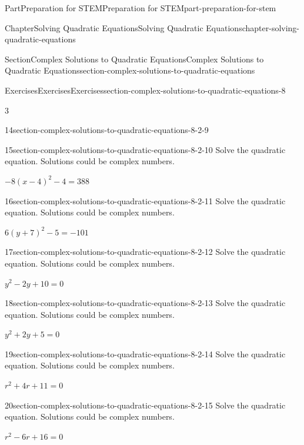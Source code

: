 \documentclass[twoside,10pt,]{book}
\numberwithin{equation}{section}
\begin{document}
\begin{partptx}{Part}{Preparation for STEM}{}{Preparation for STEM}{}{}{part-preparation-for-stem}
\begin{chapterptx}{Chapter}{Solving Quadratic Equations}{}{Solving Quadratic Equations}{}{}{chapter-solving-quadratic-equations}
\begin{sectionptx}{Section}{Complex Solutions to Quadratic Equations}{}{Complex Solutions to Quadratic Equations}{}{}{section-complex-solutions-to-quadratic-equations}
\begin{exercises-subsection}{Exercises}{Exercises}{}{Exercises}{}{}{section-complex-solutions-to-quadratic-equations-8}
\begin{exercisegroupcol}{3}
\begin{divisionexerciseegcol}{14}{}{}{section-complex-solutions-to-quadratic-equations-8-2-9}
\end{divisionexerciseegcol}%
\begin{divisionexerciseegcol}{15}{}{}{section-complex-solutions-to-quadratic-equations-8-2-10}%
Solve the quadratic equation. Solutions could be complex numbers.%
\par
\(-8(x - 4)^2 - 4 = 388\)%
\end{divisionexerciseegcol}%
\begin{divisionexerciseegcol}{16}{}{}{section-complex-solutions-to-quadratic-equations-8-2-11}%
Solve the quadratic equation. Solutions could be complex numbers.%
\par
\(6(y+7)^2 - 5 = -101\)%
\end{divisionexerciseegcol}%
\begin{divisionexerciseegcol}{17}{}{}{section-complex-solutions-to-quadratic-equations-8-2-12}%
Solve the quadratic equation. Solutions could be complex numbers.%
\par
\({y^{2}-2y+10} = 0\)%
\end{divisionexerciseegcol}%
\begin{divisionexerciseegcol}{18}{}{}{section-complex-solutions-to-quadratic-equations-8-2-13}%
Solve the quadratic equation. Solutions could be complex numbers.%
\par
\({y^{2}+2y+5} = 0\)%
\end{divisionexerciseegcol}%
\begin{divisionexerciseegcol}{19}{}{}{section-complex-solutions-to-quadratic-equations-8-2-14}%
Solve the quadratic equation. Solutions could be complex numbers.%
\par
\({r^{2}+4r+11} =0\)%
\end{divisionexerciseegcol}%
\begin{divisionexerciseegcol}{20}{}{}{section-complex-solutions-to-quadratic-equations-8-2-15}%
Solve the quadratic equation. Solutions could be complex numbers.%
\par
\({r^{2}-6r+16} =0\)%
\end{divisionexerciseegcol}%
\end{exercisegroupcol}
\par\medskip\noindent
\end{exercises-subsection}
\end{sectionptx}
\end{chapterptx}
  \end{partptx}
%
\appendix%
%
\end{document}
